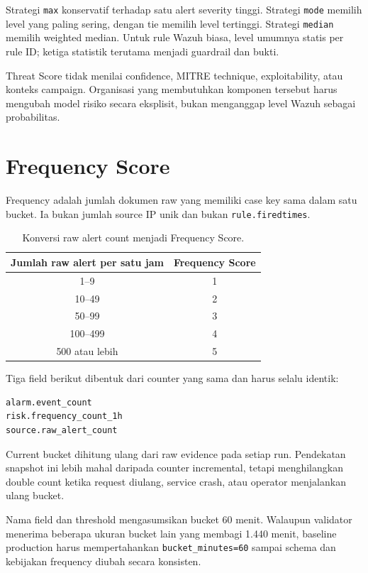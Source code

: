 \documentclass[11pt,a4paper,oneside]{report}
\DeclareRobustCommand{\code}[1]{\nolinkurl{#1}}
\begin{document}
Strategi \code{max} konservatif terhadap satu alert severity tinggi. Strategi
\code{mode} memilih level yang paling sering, dengan tie memilih level tertinggi.
Strategi \code{median} memilih weighted median. Untuk rule Wazuh biasa, level
umumnya statis per rule ID; ketiga statistik terutama menjadi guardrail dan bukti.

Threat Score tidak menilai confidence, MITRE technique, exploitability, atau
konteks campaign. Organisasi yang membutuhkan komponen tersebut harus mengubah
model risiko secara eksplisit, bukan menganggap level Wazuh sebagai probabilitas.

\chapter{Frequency Score}

Frequency adalah jumlah dokumen raw yang memiliki case key sama dalam satu bucket.
Ia bukan jumlah source IP unik dan bukan \code{rule.firedtimes}.

\begin{table}[ht]
\centering
\caption{Konversi raw alert count menjadi Frequency Score.}
\begin{tabular}{cc}
\toprule
\textbf{Jumlah raw alert per satu jam} & \textbf{Frequency Score}\\
\midrule
1--9 & 1\\
10--49 & 2\\
50--99 & 3\\
100--499 & 4\\
500 atau lebih & 5\\
\bottomrule
\end{tabular}
\end{table}

Tiga field berikut dibentuk dari counter yang sama dan harus selalu identik:

\begin{lstlisting}
alarm.event_count
risk.frequency_count_1h
source.raw_alert_count
\end{lstlisting}

Current bucket dihitung ulang dari raw evidence pada setiap run. Pendekatan snapshot
ini lebih mahal daripada counter incremental, tetapi menghilangkan double count
ketika request diulang, service crash, atau operator menjalankan ulang bucket.

Nama field dan threshold mengasumsikan bucket 60 menit. Walaupun validator menerima
beberapa ukuran bucket lain yang membagi 1.440 menit, baseline production harus
mempertahankan \code{bucket\_minutes=60} sampai schema dan kebijakan frequency
diubah secara konsisten.
\end{document}
